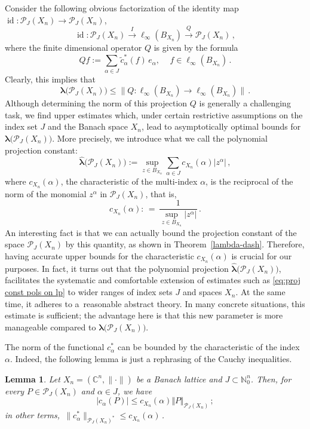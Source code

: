 \documentclass[12pt]{amsart}
\numberwithin{subsection}{section}
\newtheorem{lemma}[theorem]{Lemma}
\theoremstyle{definition}
\theoremstyle{remark}
\DeclareMathOperator{\id}{\mathrm{id}}
\begin{document}
Consider the following obvious factorization of the identity map $\id \colon \mathcal{P}_J(X_n) \to
\mathcal{P}_J(X_n)$,
\[
\id \colon \mathcal{P}_J(X_n) \stackrel{I} \longrightarrow  \ell_\infty(B_{X_n}) \stackrel{Q}
\longrightarrow \mathcal{P}_J(X_n)\,,
\]
where the finite dimensional operator $Q$ is given by the formula
\begin{equation}\label{QQQ}
Qf := \sum_{\alpha \in J} \widetilde{c}_{\alpha}^{*}(f) \,e_\alpha, \quad\, f \in \ell_\infty(B_{X_n})\,.
\end{equation}
Clearly, this implies that
\[
\boldsymbol{\lambda}\big(\mathcal{P}_J(X_n)\big) \leq \big\|Q\colon \ell_\infty(B_{X_n}) \to\ell_\infty(B_{X_n})\big\|\,.
\]
Although determining the norm of this projection $Q$ is generally a challenging task, we find upper estimates which, under certain
restrictive assumptions on the index set $J$ and the Banach space $X_n$, lead to asymptotically optimal bounds for $\boldsymbol{\lambda}\big(\mathcal{P}_J(X_n)\big)$. More precisely, we introduce what we call the polynomial projection constant:
\[
\widehat{\boldsymbol{\lambda}}\big(\mathcal P_J(X_n)\big):= \sup_{z \in B_{X_n}} \sum_{\alpha \in J} c_{X_n}(\alpha) \vert z^{\alpha}\vert\,,
\]
where $c_{X_n}(\alpha)$, the  characteristic of the multi-index $\alpha$, is the reciprocal of the norm of the monomial $z^{\alpha}$ in $\mathcal{P}_J(X_n)$, that is,
\[
c_{X_n}(\alpha):\, = \,\frac{1}{\sup_{z \in B_{X_n}} |z^\alpha|}\,.
\]
An interesting fact is that we can actually bound the projection constant of the space $\mathcal{P}_J(X_n)$ by this quantity, as shown
in Theorem~\ref{lambda-dash}.  Therefore, having accurate upper bounds for the  characteristic $c_{X_n}(\alpha)$ is crucial for our
purposes. In fact,  it turns out that the polynomial projection $\widehat{\boldsymbol{\lambda}}\big(\mathcal{P}_J(X_n)\big)$, facilitates
the systematic and  comfortable extension of estimates such as \eqref{eq:proj const pols on lp} to wider ranges of index sets $J$ and
spaces $X_n$. At the same time, it adheres to a~reasonable abstract theory. In many concrete situations, this estimate is sufficient;
the advantage here is that this new parameter is more manageable compared to $\boldsymbol{\lambda}\big(\mathcal{P}_J(X_n)\big)$.



The norm of the functional $c_{\alpha}^*$ can be bounded by the characteristic of the index $\alpha$.
Indeed, the following lemma is just a rephrasing of the Cauchy inequalities.
\begin{lemma} \label{sup}
Let $X_n = (\mathbb{C}^n, \|\cdot\|)$ be a Banach lattice and $J \subset \mathbb{N}_0^n$. Then, for every $P \in \mathcal{P}_J(X_n)$ and
$\alpha \in J $, we have
\[
|c_\alpha(P)| \leq c_{X_n}(\alpha) \Vert P \Vert_{\mathcal{P}_J(X_n)}\,;
\]
in other terms, $\,\big\|c_\alpha^{*}\big\|_{\mathcal{P}_J(X_n)^\ast} \leq  c_{X_n}(\alpha)$\,.
\end{lemma}
\end{document}
